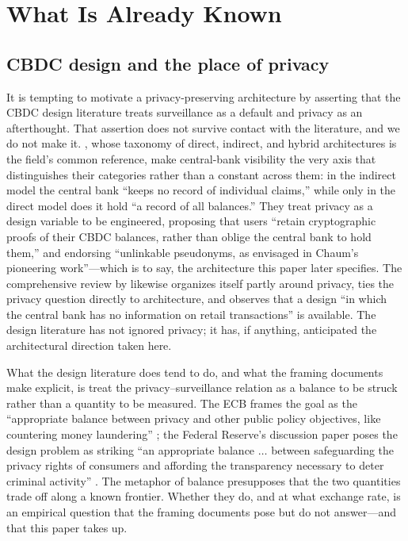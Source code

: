 \documentclass[11pt]{article}
\begin{document}
\section{What Is Already Known}
\label{sec:already-known}

\subsection{CBDC design and the place of privacy}

It is tempting to motivate a privacy-preserving architecture by asserting that the CBDC design
literature treats surveillance as a default and privacy as an afterthought. That assertion does not
survive contact with the literature, and we do not make it. \citet{AuerBohme2020}, whose taxonomy of
direct, indirect, and hybrid architectures is the field's common reference, make central-bank
visibility the very axis that distinguishes their categories rather than a constant across them: in
the indirect model the central bank ``keeps no record of individual claims,'' while only in the
direct model does it hold ``a record of all balances.'' They treat privacy as a design variable to
be engineered, proposing that users ``retain cryptographic proofs of their CBDC balances, rather than
oblige the central bank to hold them,'' and endorsing ``unlinkable pseudonyms, as envisaged in
Chaum's pioneering work''---which is to say, the architecture this paper later specifies. The
comprehensive review by \citet{AuerFrostGambacorta2022} likewise organizes itself partly around
privacy, ties the privacy question directly to architecture, and observes that a design ``in which
the central bank has no information on retail transactions'' is available. The design literature has
not ignored privacy; it has, if anything, anticipated the architectural direction taken here.

What the design literature does tend to do, and what the framing documents make explicit, is treat
the privacy--surveillance relation as a balance to be struck rather than a quantity to be measured.
The ECB frames the goal as the ``appropriate balance between privacy and other public policy
objectives, like countering money laundering'' \citep{ECB2024Blog}; the Federal Reserve's discussion
paper poses the design problem as striking ``an appropriate balance $\ldots$ between safeguarding the
privacy rights of consumers and affording the transparency necessary to deter criminal activity''
\citep{FedReserve2022}. The metaphor of balance presupposes that the two quantities trade off along a
known frontier. Whether they do, and at what exchange rate, is an empirical question that the framing
documents pose but do not answer---and that this paper takes up.
\end{document}
